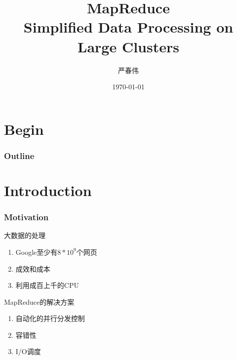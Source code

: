\documentclass{beamer}
\title{MapReduce\\ Simplified Data Processing on Large Clusters}
\author{严春伟}
\institute[PKUSZ]{
    互联网研发中心\\
}
\date{\today}
\begin{document}
\begin{frame}
  \titlepage
\end{frame}

\section{Begin}
\begin{frame}
\frametitle{Outline}
\tableofcontents
\end{frame}

\section{Introduction}
\begin{frame}
\frametitle{Motivation}
    \begin{block}{大数据的处理}
        \begin{enumerate}
            \item Google至少有$8*10^9$个网页
            \pause
            \item 成效和成本
            \pause
            \item 利用成百上千的CPU
        \end{enumerate}
    \end{block}
    \begin{block}{MapReduce的解决方案}
        \begin{enumerate}
        \item 自动化的并行分发控制
        \item 容错性
        \item I/O调度
        \end{enumerate}
    \end{block}
\end{frame}
\end{document}
